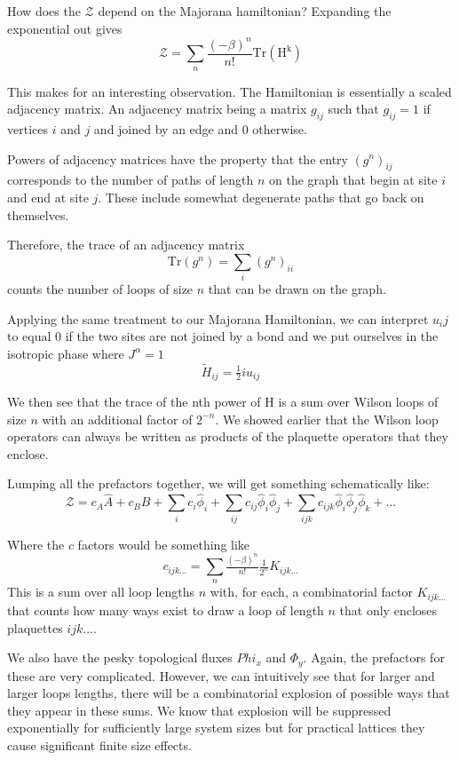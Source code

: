 How does the \(\mathcal{Z}\) depend on the Majorana hamiltonian? Expanding the exponential out gives \[ \mathcal{Z} = \sum_n \frac{(-\beta)^n}{n!} \mathrm{Tr(H^k)} \]

This makes for an interesting observation. The Hamiltonian is essentially a scaled adjacency matrix. An adjacency matrix being a matrix \(g_{ij}\) such that \(g_{ij} = 1\) if vertices \(i\) and \(j\) and joined by an edge and 0 otherwise.

Powers of adjacency matrices have the property that the entry \((g^n)_{ij}\) corresponds to the number of paths of length \(n\) on the graph that begin at site \(i\) and end at site \(j\). These include somewhat degenerate paths that go back on themselves.

Therefore, the trace of an adjacency matrix \[\mathrm{Tr}(g^n) = \sum_i (g^n)_{ii}\] counts the number of loops of size \(n\) that can be drawn on the graph.

Applying the same treatment to our Majorana Hamiltonian, we can interpret \(u_ij\) to equal 0 if the two sites are not joined by a bond and we put ourselves in the isotropic phase where \(J^\alpha = 1\) \[ \tilde{H}_{ij} =  \tfrac{1}{2} i u_{ij}\]

We then see that the trace of the nth power of H is a sum over Wilson loops of size \(n\) with an additional factor of \(2^{-n}\). We showed earlier that the Wilson loop operators can always be written as products of the plaquette operators that they enclose.

Lumping all the prefactors together, we will get something schematically like: \[ \mathcal{Z} = c_A \hat{A} + c_B \hat{B} + \sum_i c_i \hat{\phi}_i + \sum_{ij} c_{ij}  \hat{\phi}_i \hat{\phi}_j + \sum_{ijk} c_{ijk}  \hat{\phi}_i \hat{\phi}_j \hat{\phi}_k + ...\]

Where the \(c\) factors would be something like \[c_{ijk...} = \sum_n \tfrac{(-\beta)^n}{n!} \tfrac{1}{2^n} K_{ijk...}\] This is a sum over all loop lengths \(n\) with, for each, a combinatorial factor \(K_{ijk...}\) that counts how many ways exist to draw a loop of length \(n\) that only encloses plaquettes \(ijk...\).

We also have the pesky topological fluxes \(Phi_x\) and \(\Phi_y\). Again, the prefactors for these are very complicated. However, we can intuitively see that for larger and larger loops lengths, there will be a combinatorial explosion of possible ways that they appear in these sums. We know that explosion will be suppressed exponentially for sufficiently large system sizes but for practical lattices they cause significant finite size effects.

